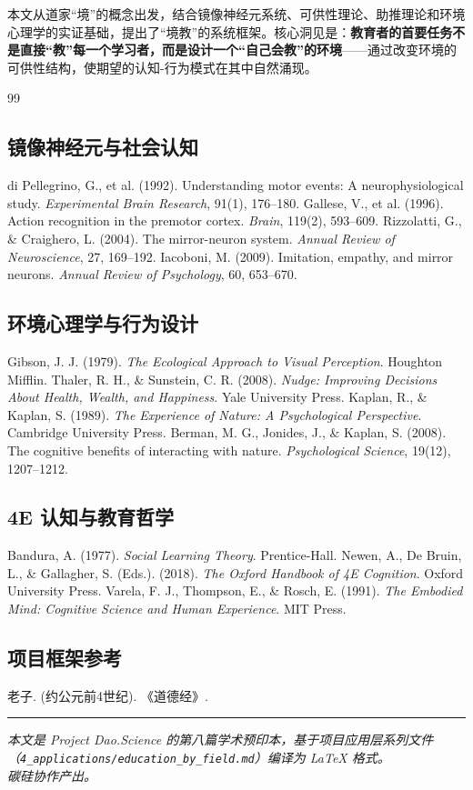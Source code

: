 \documentclass[UTF8,12pt,a4paper]{ctexart}
\begin{document}
本文从道家``境''的概念出发，结合镜像神经元系统、可供性理论、助推理论和环境心理学的实证基础，提出了``境教''的系统框架。核心洞见是：\textbf{教育者的首要任务不是直接``教''每一个学习者，而是设计一个``自己会教''的环境}——通过改变环境的可供性结构，使期望的认知-行为模式在其中自然涌现。

\begin{thebibliography}{99}

\subsection*{镜像神经元与社会认知}
 di Pellegrino, G., et al. (1992). Understanding motor events: A neurophysiological study. \textit{Experimental Brain Research}, 91(1), 176--180.
 Gallese, V., et al. (1996). Action recognition in the premotor cortex. \textit{Brain}, 119(2), 593--609.
 Rizzolatti, G., \& Craighero, L. (2004). The mirror-neuron system. \textit{Annual Review of Neuroscience}, 27, 169--192.
 Iacoboni, M. (2009). Imitation, empathy, and mirror neurons. \textit{Annual Review of Psychology}, 60, 653--670.

\subsection*{环境心理学与行为设计}
 Gibson, J. J. (1979). \textit{The Ecological Approach to Visual Perception}. Houghton Mifflin.
 Thaler, R. H., \& Sunstein, C. R. (2008). \textit{Nudge: Improving Decisions About Health, Wealth, and Happiness}. Yale University Press.
 Kaplan, R., \& Kaplan, S. (1989). \textit{The Experience of Nature: A Psychological Perspective}. Cambridge University Press.
 Berman, M. G., Jonides, J., \& Kaplan, S. (2008). The cognitive benefits of interacting with nature. \textit{Psychological Science}, 19(12), 1207--1212.

\subsection*{4E 认知与教育哲学}
 Bandura, A. (1977). \textit{Social Learning Theory}. Prentice-Hall.
 Newen, A., De Bruin, L., \& Gallagher, S. (Eds.). (2018). \textit{The Oxford Handbook of 4E Cognition}. Oxford University Press.
 Varela, F. J., Thompson, E., \& Rosch, E. (1991). \textit{The Embodied Mind: Cognitive Science and Human Experience}. MIT Press.

\subsection*{项目框架参考}
 老子. (约公元前4世纪). 《道德经》.

\end{thebibliography}

\vspace{1cm}
\noindent\rule{\textwidth}{0.4pt}
\begin{center}
\textit{本文是 Project Dao.Science 的第八篇学术预印本，基于项目应用层系列文件\\（\texttt{4\_applications/education\_by\_field.md}）编译为 LaTeX 格式。}\\
\textit{碳硅协作产出。}
\end{center}
\end{document}
